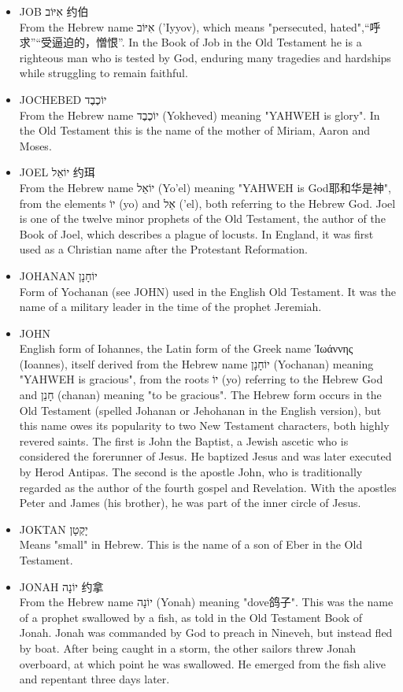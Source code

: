 \begin{itemize}
\item JOB אִיּוֹב 约伯\\
From the Hebrew name אִיּוֹב ('Iyyov), which means "persecuted, hated",“呼求”“受逼迫的，憎恨”. In the Book of Job in the Old Testament he is a righteous man who is tested by God, enduring many tragedies and hardships while struggling to remain faithful.
\item JOCHEBED יוֹכֶבֶד \\
From the Hebrew name יוֹכֶבֶד (Yokheved) meaning "YAHWEH is glory". In the Old Testament this is the name of the mother of Miriam, Aaron and Moses.
\item JOEL יוֹאֵל 约珥\\
From the Hebrew name יוֹאֵל (Yo'el) meaning "YAHWEH is God耶和华是神", from the elements יוֹ (yo) and אֵל ('el), both referring to the Hebrew God. Joel is one of the twelve minor prophets of the Old Testament, the author of the Book of Joel, which describes a plague of locusts. In England, it was first used as a Christian name after the Protestant Reformation.
\item JOHANAN יוֹחָנָן \\
Form of Yochanan (see JOHN) used in the English Old Testament. It was the name of a military leader in the time of the prophet Jeremiah.
\item JOHN \\
English form of Iohannes, the Latin form of the Greek name Ἰωάννης (Ioannes), itself derived from the Hebrew name יוֹחָנָן (Yochanan) meaning "YAHWEH is gracious", from the roots יוֹ (yo) referring to the Hebrew God and חָנַן (chanan) meaning "to be gracious". The Hebrew form occurs in the Old Testament (spelled Johanan or Jehohanan in the English version), but this name owes its popularity to two New Testament characters, both highly revered saints. The first is John the Baptist, a Jewish ascetic who is considered the forerunner of Jesus. He baptized Jesus and was later executed by Herod Antipas. The second is the apostle John, who is traditionally regarded as the author of the fourth gospel and Revelation. With the apostles Peter and James (his brother), he was part of the inner circle of Jesus.
\item JOKTAN יָקְטָן \\
Means "small" in Hebrew. This is the name of a son of Eber in the Old Testament.
\item JONAH יוֹנָה 约拿\\
From the Hebrew name יוֹנָה (Yonah) meaning "dove鸽子". This was the name of a prophet swallowed by a fish, as told in the Old Testament Book of Jonah. Jonah was commanded by God to preach in Nineveh, but instead fled by boat. After being caught in a storm, the other sailors threw Jonah overboard, at which point he was swallowed. He emerged from the fish alive and repentant three days later.

\end{itemize}

